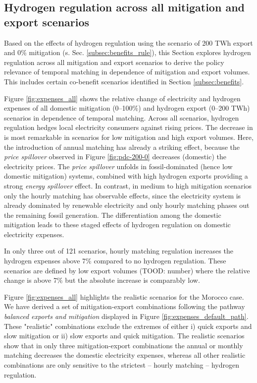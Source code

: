 \subsection{Hydrogen regulation across all mitigation and export scenarios}
\label{subsec:rule_all}

Based on the effects of hydrogen regulation using the scenario of 200 TWh export and 0\% mitigation (s. Sec. \ref{subsec:benefits_rule}), this Section explores hydrogen regulation across all mitigation and export scenarios to derive the policy relevance of temporal matching in dependence of mitigation and export volumes. This includes certain co-benefit scenarios identified in Section \ref{subsec:benefits}.


Figure \ref{fig:expenses_all} shows the relative change of electricity and hydrogen expenses of all domestic mitigation (0--100\%) and hydrogen export (0--200 TWh) scenarios in dependence of temporal matching. 
Across all scenarios, hydrogen regulation hedges local electricity consumers against rising prices. The decrease in is most remarkable in scenarios for low mitigation and high export volumes. Here, the introduction of annual matching has already a striking effect, because the \textit{price spillover} observed in Figure \ref{fig:pdc-200-0} decreases (domestic) the electricity prices. The \textit{price spillover} unfolds in fossil-dominated (hence low domestic mitigation) systems, combined with high hydrogen exports providing a strong \textit{energy spillover} effect.
In contrast, in medium to high mitigation scenarios only the hourly matching has observable effects, since the electricity system is already  dominated by renewable electricity and only hourly matching phases out the remaining fossil generation. The differentiation among the domestic mitigation leads to these staged effects of hydrogen regulation on domestic electricity expenses.

In only three out of 121 scenarios, hourly matching regulation increases the hydrogen expenses above 7\% compared to no hydrogen regulation. These scenarios are defined by low export volumes (TOOD: number) where the relative change is above 7\% but the absolute increase is comparably low.


Figure \ref{fig:expenses_all} highlights the realistic scenarios for the Morocco case. We have derived a set of mitigation-export combinations following the pathway \textit{balanced exports and mitigation} displayed in Figure \ref{fig:expenses_default_path}. These "realistic" combinations exclude the extremes of either i) quick exports and slow mitigation or ii)
slow exports and quick mitigation. The realistic scenarios show that in only three mitigation-export combinations the annual or monthly matching decreases the domestic electricity expenses, whereas all other realistic combinations are only sensitive to the strictest -- hourly matching -- hydrogen regulation. 


